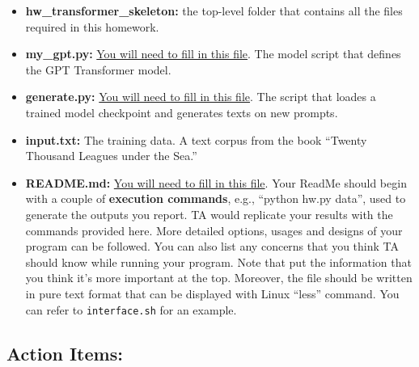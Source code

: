 %
\hfill

%
\begin{itemize}
%
\item
    \textbf{{hw\homeworknumber\_transformer\_skeleton}:}
    the top-level folder that contains all the files required in this homework.

\item
    \textbf{{my\_gpt.py}:}
    \underline{You will need to fill in this file}. The model script that defines the GPT Transformer model. 

\item
    \textbf{{generate.py}:}
    \underline{You will need to fill in this file}. The script that loades a trained model checkpoint and generates texts on new prompts.

\item
    \textbf{{input.txt}:}
    The training data. A text corpus from the book ``Twenty Thousand Leagues under the Sea.''

\item
    \textbf{README.md:}
    \underline{You will need to fill in this file}. Your ReadMe should begin with a couple of \textbf{execution commands},
    e.g., ``python hw\homeworknumber.py data'', used to generate the outputs
    you report.
    TA would replicate your results with the commands provided here.
    More detailed options, usages and designs of your program can be followed.
    You can also list any concerns that you think TA should know while running
    your program.
    Note that put the information that you think it's more important at the
    top.
    Moreover, the file should be written in pure text format that can be
    displayed with Linux ``less'' command.
    You can refer to \texttt{interface.sh} for an example.
%

%
\end{itemize}
























\subsection*{Action Items:}

